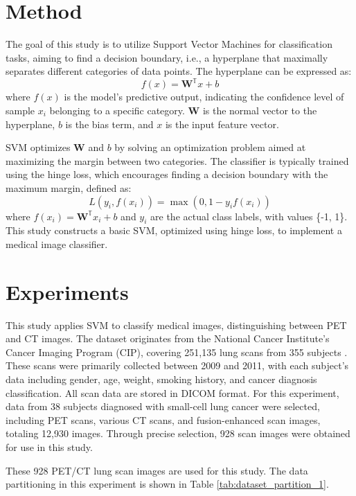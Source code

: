 \documentclass[twocolumn]{article}
\begin{document}
\section{Method}
The goal of this study is to utilize Support Vector Machines for classification tasks, aiming to find a decision boundary, i.e., a hyperplane that maximally separates different categories of data points. The hyperplane can be expressed as:
\[
	f(x) = \mathbf{W}^\mathbb{T} x + b
\]
where \(f(x)\) is the model's predictive output, indicating the confidence level of sample \(x_i\) belonging to a specific category. \( \mathbf{W} \) is the normal vector to the hyperplane, \( b \) is the bias term, and \( x \) is the input feature vector.

SVM optimizes \( \mathbf{W} \) and \( b \) by solving an optimization problem aimed at maximizing the margin between two categories. The classifier is typically trained using the hinge loss, which encourages finding a decision boundary with the maximum margin, defined as:
\[
	L(y_i, f(x_i)) = \max(0, 1 - y_i f(x_i))
\]
where \( f(x_i) = \mathbf{W}^\mathbb{T} x_i + b \) and \( y_i \) are the actual class labels, with values \{-1, 1\}. This study constructs a basic SVM, optimized using hinge loss, to implement a medical image classifier.

\section{Experiments}
This study applies SVM to classify medical images, distinguishing between PET and CT images. The dataset originates from the National Cancer Institute's Cancer Imaging Program (CIP), covering 251,135 lung scans from 355 subjects \cite{li_large-scale_2020}. These scans were primarily collected between 2009 and 2011, with each subject's data including gender, age, weight, smoking history, and cancer diagnosis classification. All scan data are stored in DICOM format. For this experiment, data from 38 subjects diagnosed with small-cell lung cancer were selected, including PET scans, various CT scans, and fusion-enhanced scan images, totaling 12,930 images. Through precise selection, 928 scan images were obtained for use in this study.

These 928 PET/CT lung scan images are used for this study. The data partitioning in this experiment is shown in Table \ref{tab:dataset_partition_1}.

\end{document}
